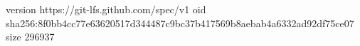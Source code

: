 version https://git-lfs.github.com/spec/v1
oid sha256:8f0bb4cc77e63620517d344487c9bc37b417569b8aebab4a6332ad92df75ce07
size 296937
